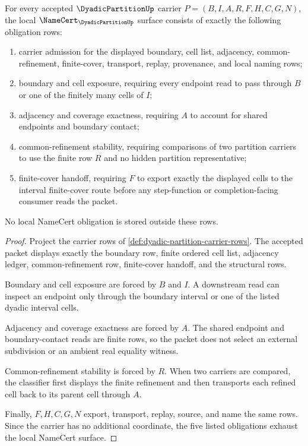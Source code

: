 \begin{theorem}
\label{thm:dyadic-partition-namecert-obligation-rows}
For every accepted $\DyadicPartitionUp$ carrier $P=(B,I,A,R,F,H,C,G,N)$, the local $\NameCert_{\DyadicPartitionUp}$ surface consists of exactly the following obligation rows:
\begin{enumerate}
\item carrier admission for the displayed boundary, cell list, adjacency, common-refinement, finite-cover, transport, replay, provenance, and local naming rows;
\item boundary and cell exposure, requiring every endpoint read to pass through $B$ or one of the finitely many cells of $I$;
\item adjacency and coverage exactness, requiring $A$ to account for shared endpoints and boundary contact;
\item common-refinement stability, requiring comparisons of two partition carriers to use the finite row $R$ and no hidden partition representative;
\item finite-cover handoff, requiring $F$ to export exactly the displayed cells to the interval finite-cover route before any step-function or completion-facing consumer reads the packet.
\end{enumerate}
No local NameCert obligation is stored outside these rows.
\end{theorem}
\begin{proof}
Project the carrier rows of \autoref{def:dyadic-partition-carrier-rows}. The accepted packet displays exactly the boundary row, finite ordered cell list, adjacency ledger, common-refinement row, finite-cover handoff, and the structural rows.

Boundary and cell exposure are forced by $B$ and $I$. A downstream read can inspect an endpoint only through the boundary interval or one of the listed dyadic interval cells.

Adjacency and coverage exactness are forced by $A$. The shared endpoint and boundary-contact reads are finite rows, so the packet does not select an external subdivision or an ambient real equality witness.

Common-refinement stability is forced by $R$. When two carriers are compared, the classifier first displays the finite refinement and then transports each refined cell back to its parent cell through $A$.

Finally, $F,H,C,G,N$ export, transport, replay, source, and name the same rows. Since the carrier has no additional coordinate, the five listed obligations exhaust the local NameCert surface.
\end{proof}

